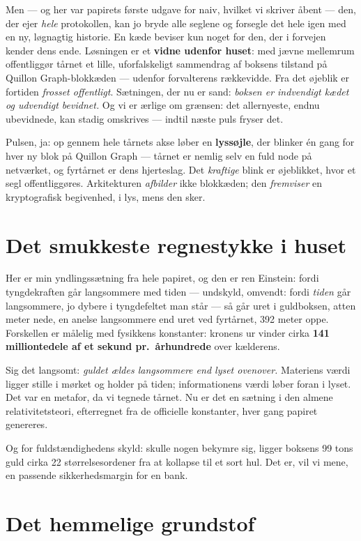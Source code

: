 \documentclass[11pt,a4paper]{article}
\begin{document}
Men --- og her var papirets første udgave for naiv, hvilket vi skriver åbent
--- den, der ejer \emph{hele} protokollen, kan jo bryde alle seglene og
forsegle det hele igen med en ny, løgnagtig historie. En kæde beviser kun
noget for den, der i forvejen kender dens ende. Løsningen er et \textbf{vidne
udenfor huset}: med jævne mellemrum offentliggør tårnet et lille, uforfalskeligt
sammendrag af boksens tilstand på Quillon Graph-blokkæden --- udenfor
forvalterens rækkevidde. Fra det øjeblik er fortiden \emph{frosset offentligt}.
Sætningen, der nu er sand: \emph{boksen er indvendigt kædet og udvendigt
bevidnet.} Og vi er ærlige om grænsen: det allernyeste, endnu ubevidnede,
kan stadig omskrives --- indtil næste puls fryser det.

Pulsen, ja: op gennem hele tårnets akse løber en \textbf{lyssøjle}, der blinker
én gang for hver ny blok på Quillon Graph --- tårnet er nemlig selv en fuld
node på netværket, og fyrtårnet er dens hjerteslag. Det \emph{kraftige} blink
er øjeblikket, hvor et segl offentliggøres. Arkitekturen \emph{afbilder} ikke
blokkæden; den \emph{fremviser} en kryptografisk begivenhed, i lys, mens den
sker.

\section*{Det smukkeste regnestykke i huset}

Her er min yndlingssætning fra hele papiret, og den er ren Einstein: fordi
tyngdekraften går langsommere med tiden --- undskyld, omvendt: fordi \emph{tiden}
går langsommere, jo dybere i tyngdefeltet man står --- så går uret i guldboksen,
atten meter nede, en anelse langsommere end uret ved fyrtårnet, 392 meter oppe.
Forskellen er målelig med fysikkens konstanter: kronens ur vinder cirka
\textbf{141 milliontedele af et sekund pr.\ århundrede} over kælderens.

Sig det langsomt: \emph{guldet ældes langsommere end lyset ovenover.} Materiens
værdi ligger stille i mørket og holder på tiden; informationens værdi løber
foran i lyset. Det var en metafor, da vi tegnede tårnet. Nu er det en sætning
i den almene relativitetsteori, efterregnet fra de officielle konstanter, hver
gang papiret genereres.

Og for fuldstændighedens skyld: skulle nogen bekymre sig, ligger boksens 99
tons guld cirka 22 størrelsesordener fra at kollapse til et sort hul. Det er,
vil vi mene, en passende sikkerhedsmargin for en bank.

\section*{Det hemmelige grundstof}
\end{document}
